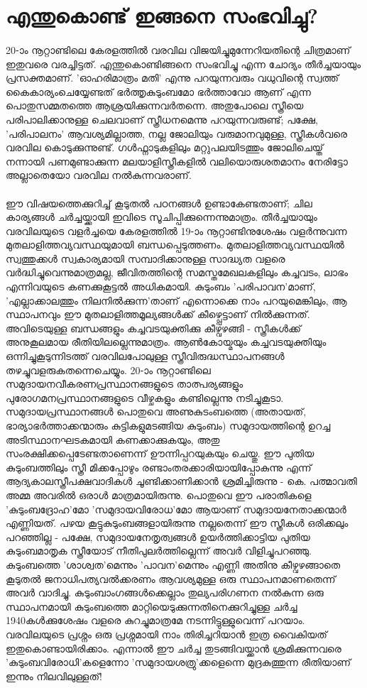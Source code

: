 \section{എന്തുകൊണ്ട് ഇങ്ങനെ സംഭവിച്ചു?}
\label{ch5sec3}

\paragraph{}20-ാം നൂറ്റാണ്ടിലെ കേരളത്തിൽ വരവില വിജയിച്ചുമുന്നേറിയതിന്റെ ചിത്രമാണ് ഇതുവരെ വരച്ചിട്ടത്. എന്തുകൊണ്ടിങ്ങനെ സംഭവിച്ചു എന്ന ചോദ്യം തീർച്ചയായും പ്രസക്തമാണ്. 'ഓഹരിമാത്രം മതി' എന്നു പറയുന്നവരും വധുവിന്റെ സ്വത്ത് കൈകാര്യംചെയ്യേണ്ടത് ഭർത്തൃകുടുംബമോ ഭർത്താവോ ആണ് എന്ന പൊതുസമ്മതത്തെ ആശ്രയിക്കുന്നവർതന്നെ. അതുപോലെ സ്ത്രീയെ പരിപാലിക്കാനുള്ള ചെലവാണ് സ്ത്രീധനമെന്നു പറയുന്നവരുണ്ട്; പക്ഷേ, 'പരിപാലനം' ആവശ്യമില്ലാത്ത, നല്ല ജോലിയും വരുമാനവുമുള്ള, സ്ത്രീകൾവരെ വരവില കൊടുക്കുന്നുണ്ട്. ഗൾഫ്നാടുകളിലും മറ്റുപലയിടത്തും ജോലിചെയ്ത് നന്നായി പണമുണ്ടാക്കുന്ന മലയാളിസ്ത്രീകളിൽ വലിയൊരുശതമാനം നേരിട്ടോ അല്ലാതെയോ വരവില നൽകുന്നവരാണ്.

\paragraph{}ഈ വിഷയത്തെക്കുറിച്ച് കൂടുതൽ പഠനങ്ങൾ ഉണ്ടാകേണ്ടതാണ്; ചില കാര്യങ്ങൾ ചർച്ചയ്ക്കായി ഇവിടെ സൂചിപ്പിക്കുന്നെന്നുമാത്രം. തീർച്ചയായും വരവിലയുടെ വളർച്ചയെ കേരളത്തിൽ 19-ാം നൂറ്റാണ്ടിനുശേഷം വളർന്നുവന്ന മുതലാളിത്തവ്യവസ്ഥയുമായി ബന്ധപ്പെടുത്തണം. മുതലാളിത്തവ്യവസ്ഥയിൽ സ്വത്തുക്കൾ സ്വകാര്യമായി സമ്പാദിക്കാനുള്ള സാദ്ധ്യത വളരെ വർദ്ധിച്ചുവെന്നുമാത്രമല്ല, ജീവിതത്തിന്റെ സമസ്തമേഖലകളിലും കച്ചവടം, ലാഭം എന്നിവയുടെ കണക്കുകൂട്ടൽ അധികമായി. കുടുംബം 'പരിപാവന'മാണ്, 'എല്ലാക്കാലത്തും നിലനിൽക്കുന്ന'താണ് എന്നൊക്കെ നാം പറയുമെങ്കിലും, ആ സ്ഥാപനവും ഈ മുതലാളിത്തമൂല്യങ്ങൾക്ക് കീഴ്പ്പെട്ടാണ് നിൽക്കുന്നത്. അവിടെയുള്ള ബന്ധങ്ങളും കച്ചവടയുക്തിക്കു കീഴ്വഴങ്ങി - സ്ത്രീകൾക്ക് അനുകൂലമായ രീതിയിലല്ലെന്നുമാത്രം. ആൺകോയ്മയും കച്ചവടയുക്തിയും ഒന്നിച്ചുകൂടുന്നിടത്ത് വരവിലപോലുള്ള സ്ത്രീവിരുദ്ധസ്ഥാപനങ്ങൾ തഴച്ചുവളരുകതന്നെചെയ്യും. 20-ാം നൂറ്റാണ്ടിലെ സമുദായനവീകരണപ്രസ്ഥാനങ്ങളുടെ താത്പര്യങ്ങളും പുരോഗമനപ്രസ്ഥാനങ്ങളുടെ വീഴ്ചകളും കണ്ടില്ലെന്നു നടിച്ചുകൂടാ. സമുദായപ്രസ്ഥാനങ്ങൾ പൊതുവെ അണുകുടംബത്തെ (അതായത്, ഭാര്യാഭർത്താക്കന്മാരും കുട്ടികളുമടങ്ങിയ കുടുംബം) സമുദായത്തിന്റെ ഉറച്ച അടിസ്ഥാനഘടകമായി കണക്കാക്കുകയും, അതു സംരക്ഷിക്കപ്പെടേണ്ടതാണെന്ന് ഊന്നിപ്പറയുകയും ചെയ്തു. ഈ പുതിയ കുടുംബത്തിലും സ്ത്രീ മിക്കപ്പോഴും രണ്ടാംതരക്കാരിയായിപ്പോകുന്നു എന്ന് ആദ്യകാലസ്ത്രീപക്ഷവാദികൾ ചൂണ്ടിക്കാണിക്കാൻ ശ്രമിച്ചിരുന്നു - കെ. പത്മാവതി അമ്മ അവരിൽ ഒരാൾ മാത്രമായിരുന്നു. പൊതുവെ ഈ പരാതികളെ 'കുടുംബദ്രോഹ'മോ 'സമുദായവിരോധ'മോ ആയാണ് സമുദായനേതാക്കന്മാർ എണ്ണിയത്. പഴയ കൂട്ടുകുടുംബങ്ങളായിരുന്നു നല്ലതെന്ന് ഈ സ്ത്രീകൾ ഒരിക്കലും പറഞ്ഞില്ല - പക്ഷേ, സമുദായനേതൃത്വങ്ങൾ ഉയർത്തിക്കാട്ടിയ പുതിയ കുടുംബമാതൃക സ്ത്രീയോട് നീതിപുലർത്തില്ലെന്ന് അവർ വിളിച്ചുപറഞ്ഞു. കുടുംബത്തെ 'ശാശ്വത'മെന്നും 'പാവന'മെന്നും എണ്ണി അതിനു കീഴ്വഴങ്ങാതെ കൂടുതൽ ജനാധിപത്യവൽക്കരണം ആവശ്യമുള്ള ഒരു സ്ഥാപനമാണതെന്ന് അവർ വാദിച്ചു. കുടുംബാംഗങ്ങൾക്കെല്ലാം തുല്യപരിഗണന നൽകുന്ന ഒരു സ്ഥാപനമായി കുടുംബത്തെ മാറ്റിയെടുക്കുന്നതിനെക്കുറിച്ചുള്ള ചർച്ച 1940കൾക്കുശേഷം വളരെ കുറച്ചുമാത്രമേ നടന്നിട്ടുള്ളുവെന്ന് പറയാം. വരവിലയുടെ പ്രശ്നം ഒരു പ്രശ്നമായി നാം തിരിച്ചറിയാൻ ഇത്ര വൈകിയത് ഇതുകൊണ്ടായിരിക്കാം. എന്നാൽ ഈ ചർച്ച തുടങ്ങിവയ്ക്കാൻ ശ്രമിക്കുന്നവരെ 'കുടുംബവിരോധി'കളെന്നോ 'സമുദായശത്രു'ക്കളെന്നെ മുദ്രകുത്തുന്ന രീതിയാണ് ഇന്നും നിലവിലുള്ളത്!

